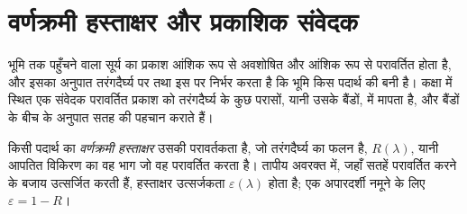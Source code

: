 \section{वर्णक्रमी हस्ताक्षर और प्रकाशिक संवेदक}\label{sec:b3:remote-sensing-gis:optical}

भूमि तक पहुँचने वाला सूर्य का प्रकाश आंशिक रूप से अवशोषित और आंशिक रूप से परावर्तित होता है,
और इसका अनुपात तरंगदैर्घ्य पर तथा इस पर निर्भर करता है कि भूमि किस पदार्थ की बनी है।
कक्षा में स्थित एक संवेदक परावर्तित प्रकाश को तरंगदैर्घ्य के कुछ परासों, यानी उसके बैंडों,
में मापता है, और बैंडों के बीच के अनुपात
सतह की पहचान कराते हैं।

\begin{definition}[वर्णक्रमी हस्ताक्षर]\label{def:b3:remote-sensing-gis:signature}
किसी पदार्थ का \emph{वर्णक्रमी हस्ताक्षर} उसकी
परावर्तकता है, जो तरंगदैर्घ्य का फलन है, $R(\lambda)$, यानी आपतित विकिरण का वह भाग
जो वह परावर्तित करता है। तापीय अवरक्त में, जहाँ सतहें परावर्तित करने के बजाय उत्सर्जित करती हैं,
हस्ताक्षर उत्सर्जकता $\varepsilon(\lambda)$ होता है;
एक अपारदर्शी नमूने के लिए $\varepsilon = 1 - R$।
\end{definition}


